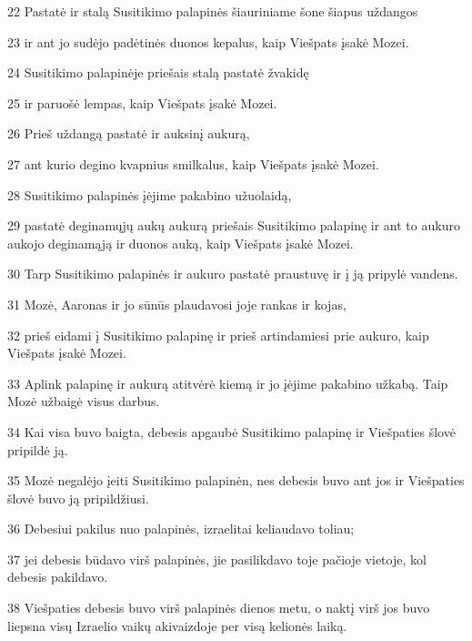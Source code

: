 \par 22 Pastatė ir stalą Susitikimo palapinės šiauriniame šone šiapus uždangos 
\par 23 ir ant jo sudėjo padėtinės duonos kepalus, kaip Viešpats įsakė Mozei. 
\par 24 Susitikimo palapinėje priešais stalą pastatė žvakidę 
\par 25 ir paruošė lempas, kaip Viešpats įsakė Mozei. 
\par 26 Prieš uždangą pastatė ir auksinį aukurą, 
\par 27 ant kurio degino kvapnius smilkalus, kaip Viešpats įsakė Mozei. 
\par 28 Susitikimo palapinės įėjime pakabino užuolaidą, 
\par 29 pastatė deginamųjų aukų aukurą priešais Susitikimo palapinę ir ant to aukuro aukojo deginamąją ir duonos auką, kaip Viešpats įsakė Mozei. 
\par 30 Tarp Susitikimo palapinės ir aukuro pastatė praustuvę ir į ją pripylė vandens. 
\par 31 Mozė, Aaronas ir jo sūnūs plaudavosi joje rankas ir kojas, 
\par 32 prieš eidami į Susitikimo palapinę ir prieš artindamiesi prie aukuro, kaip Viešpats įsakė Mozei. 
\par 33 Aplink palapinę ir aukurą atitvėrė kiemą ir jo įėjime pakabino užkabą. Taip Mozė užbaigė visus darbus. 
\par 34 Kai visa buvo baigta, debesis apgaubė Susitikimo palapinę ir Viešpaties šlovė pripildė ją. 
\par 35 Mozė negalėjo įeiti Susitikimo palapinėn, nes debesis buvo ant jos ir Viešpaties šlovė buvo ją pripildžiusi. 
\par 36 Debesiui pakilus nuo palapinės, izraelitai keliaudavo toliau; 
\par 37 jei debesis būdavo virš palapinės, jie pasilikdavo toje pačioje vietoje, kol debesis pakildavo. 
\par 38 Viešpaties debesis buvo virš palapinės dienos metu, o naktį virš jos buvo liepsna visų Izraelio vaikų akivaizdoje per visą kelionės laiką.




